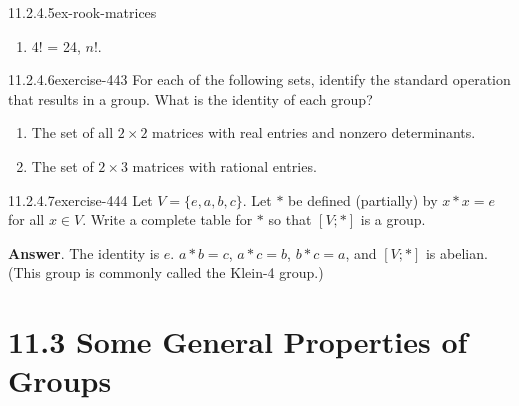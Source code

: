 \documentclass[twoside,10pt,]{book}
\numberwithin{equation}{section}
\begin{document}
\begin{divisionsolution}{11.2.4.5}{}{ex-rook-matrices}
\begin{enumerate}[label=(\alph*)]
\begin{equation*}
\begin{array}{c|c}
\begin{array}{c}
\end{array}
& 
\begin{array}{cccccc}
I & R_1 & R_2 & F_1 & F_2 & F_3 \\
R_1 & R_2 & I & F_2 & F_3 & F_1 \\
R_2 & I & R_1 & F_3 & F_1 & F_2 \\
F_1 & F & F_2 & I & R_2 & R_1 \\
F_2 & F_1 & F_3 & R_1 & I & R_2 \\
F_3 & F_2 & F_1 & R_2 & R_1 & I \\
\end{array}
\\
\end{array}
\end{equation*}
This group is non-abelian since, for example,  \(F_1 F_2=R_2\) and \(F_2 F_1=R_2\).%
\item\hypertarget{li-1771}{}\hypertarget{p-3871}{}%
4! = 24, \(n!\).%
\end{enumerate}
%
\end{divisionsolution}%
\begin{divisionsolution}{11.2.4.6}{}{exercise-443}%
\hypertarget{p-3872}{}%
For each of the following sets, identify the standard operation that results in a group. What is the identity of each group?\leavevmode%
\begin{enumerate}[label=(\alph*)]
\item\hypertarget{li-1772}{}\hypertarget{p-3873}{}%
The set of all \(2\times 2\) matrices with real entries and nonzero determinants.%
\item\hypertarget{li-1773}{}\hypertarget{p-3874}{}%
The set of \(2 \times  3\) matrices with rational entries.%
\end{enumerate}
%
\end{divisionsolution}%
\begin{divisionsolution}{11.2.4.7}{}{exercise-444}%
\hypertarget{p-3875}{}%
Let \(V = \{e,a,b, c\}\).  Let \(*\) be defined (partially) by \(x * x = e\) for all \(x \in  V\). Write a complete table for \(*\) so that \([V; * ]\) is a group.%
\par\smallskip%
\noindent\textbf{Answer}.\quad%
\hypertarget{p-3876}{}%
The identity is \(e\).   \(a*b = c\), \(a*c= b\),  \(b*c = a\), and \([V; *]\) is abelian. (This group is commonly called the Klein-4 group.)%
\end{divisionsolution}%
\section*{11.3 Some General Properties of Groups}
\end{document}
